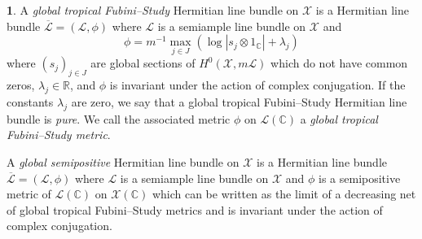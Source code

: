 \documentclass[11pt,reqno]{amsart}
\newcommand{\mR}{\mathbb{R}}
\newcommand{\mC}{\mathbb{C}}
\newcommand{\cX}{\mathcal{X}}
\newcommand{\cL}{\mathcal{L}}
\newcommand{\sH}{{\mathscr H}}
\theoremstyle{theorem}
\numberwithin{equation}{subsection}
\numberwithin{equation}{subsection}
\theoremstyle{definition}
\newtheorem{definition}[subsubsection]{\text{Definition}}
\theoremstyle{remark}
\numberwithin{equation}{subsubsection} \numberwithin{figure}{section}
\DeclareMathOperator{\an}{an}
\newcommand{\cdef}[1]{\textsf{\textit{#1}}}
\begin{document}
%



\begin{definition}\label{defn:GTFSH}
A \cdef{global tropical Fubini--Study} Hermitian line bundle on $\cX$ is a Hermitian line bundle $\overline{\cL} = (\cL,\phi)$ where $\cL$ is a semiample line bundle on $\cX$ and 
\[
\phi = m^{-1}\max_{j\in J} (\log |s_{j}\otimes 1_{\mC}| + \lambda_{j})
\]
where $(s_{j})_{j\in J}$ are global sections of $H^0(\cX,m\cL)$ which do not have common zeros, $\lambda_{j} \in \mR$, and $\phi$ is invariant under the action of complex conjugation. 
If the constants $\lambda_j$ are zero, we say that a global tropical Fubini--Study Hermitian line bundle is \cdef{pure}.  
We call the associated metric $\phi$ on $\cL(\mC)$ a \cdef{global tropical Fubini--Study metric}.

A \cdef{global semipositive} Hermitian line bundle on $\cX$ is a Hermitian line bundle $\overline{\cL} = (\cL,\phi)$ where $\cL$ is a semiample line bundle on $\cX$ and $\phi$ is a semipositive metric of $\cL(\mC)$ on $\cX(\mC)$ which can be written as the limit of a decreasing net of global tropical Fubini--Study metrics and is invariant under the action of complex conjugation. 
\end{definition}
\end{document}
